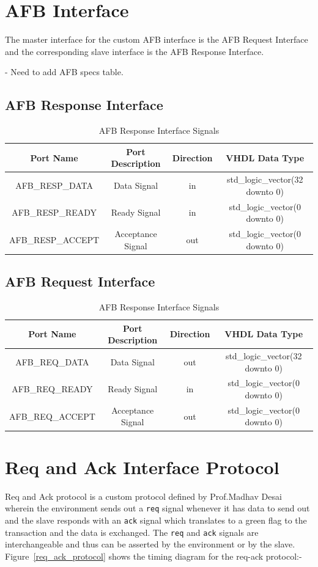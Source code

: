 \section{AFB Interface}
The master interface for the custom AFB interface is the AFB Request Interface and the corresponding slave interface is the AFB Response
Interface.

- Need to add AFB specs table.

\subsection{AFB Response Interface}
\begin{table}[H]
\begin{tabular}{c | c | c | c}	
\hline
Port Name & Port Description & Direction & VHDL Data Type\\
\hline
AFB\_RESP\_DATA 	& Data Signal 	& in & std\_logic\_vector(32 downto 0) \\
AFB\_RESP\_READY 	& Ready Signal 	& in & std\_logic\_vector(0 downto 0)  \\
AFB\_RESP\_ACCEPT & Acceptance Signal & out & std\_logic\_vector(0 downto 0)  \\
\end{tabular}
\caption{AFB Response Interface Signals}
\end{table}

\subsection{AFB Request Interface}
\begin{table}[H]
\begin{tabular}{c | c | c | c}
\hline
Port Name & Port Description & Direction & VHDL Data Type\\
\hline
AFB\_REQ\_DATA 	 & Data Signal	     & out  & std\_logic\_vector(32 downto 0) \\
AFB\_REQ\_READY  & Ready Signal      & in   & std\_logic\_vector(0 downto 0)  \\
AFB\_REQ\_ACCEPT & Acceptance Signal & out  & std\_logic\_vector(0 downto 0)  \\
\end{tabular}
\caption{AFB Response Interface Signals}
\end{table}

\section{Req and Ack Interface Protocol}
Req and Ack protocol is a custom protocol defined by Prof.Madhav Desai wherein the environment sends out a \verb|req| signal whenever it has
data to send out and the slave responds with an \verb|ack| signal which translates to a green flag to the transaction and the data is
exchanged.  The \verb|req| and \verb|ack| signals are interchangeable and thus can be asserted by the environment or by the slave.
Figure~\ref{req_ack_protocol} shows the timing diagram for the req-ack protocol:-

